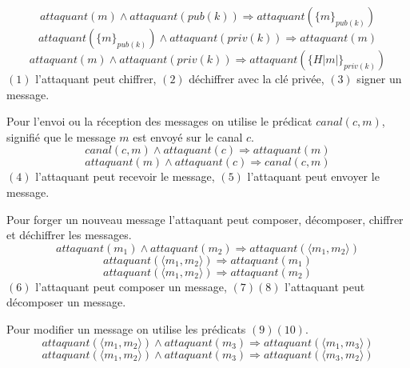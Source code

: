 \documentclass[10pt,a4paper]{article}
\begin{document}
\begin{equation}
attaquant(m)\wedge attaquant(pub(k))\Longrightarrow attaquant({\lbrace m\rbrace}_{pub(k)})
\end{equation}
\begin{equation}
attaquant({\lbrace m\rbrace}_{pub(k)}) \wedge attaquant(priv(k))\Longrightarrow attaquant(m) 
\end{equation}
\begin{equation}
attaquant(m)\wedge attaquant(priv(k))\Longrightarrow attaquant({\lbrace H|m|\rbrace}_{priv(k)})
\end{equation}
$(1)$ l'attaquant peut chiffrer, $(2)$ déchiffrer avec la clé privée, $(3)$ signer un message.\newline

Pour l'envoi ou la réception des messages on utilise le prédicat $canal(c,m)$, signifié que le message $m$ est envoyé sur le canal $c$.  
\begin{equation}
canal(c,m)\wedge attaquant(c)\Longrightarrow attaquant(m)
\end{equation}
\begin{equation}
attaquant(m)\wedge attaquant(c)\Longrightarrow canal(c,m) 
\end{equation}
$(4)$ l'attaquant peut recevoir le message, $(5)$ l'attaquant peut envoyer le message.\newline

Pour forger un nouveau message l'attaquant peut composer, décomposer, chiffrer et déchiffrer les messages.
\begin{equation}
attaquant(m_{1})\wedge attaquant(m_{2})\Longrightarrow attaquant(\langle m_{1},m_{2}\rangle) 
\end{equation}
\begin{equation}
attaquant(\langle m_{1},m_{2}\rangle)\Longrightarrow attaquant(m_{1}) 
\end{equation}
\begin{equation}
attaquant(\langle m_{1},m_{2}\rangle)\Longrightarrow attaquant(m_{2}) 
\end{equation}
$(6)$ l'attaquant peut composer un message, $(7)(8)$ l'attaquant peut décomposer un message.\newline 

Pour modifier un message on utilise les prédicats $(9)(10)$.\newline
\begin{equation}
attaquant(\langle m_{1},m_{2}\rangle)\wedge attaquant(m_{3})\Longrightarrow attaquant(\langle m_{1},m_{3}\rangle) 
\end{equation}
\begin{equation}
attaquant(\langle m_{1},m_{2}\rangle)\wedge attaquant(m_{3})\Longrightarrow attaquant(\langle m_{3},m_{2}\rangle) 
\end{equation}
\end{document}
